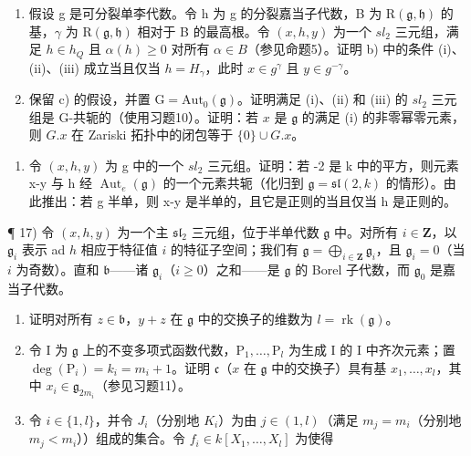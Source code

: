 \begin{enumerate}
\def\labelenumi{\alph{enumi})}
\setcounter{enumi}{2}
\item
  假设 g 是可分裂单李代数。令 h 为 g 的分裂嘉当子代数，B 为 \(\mathrm{R}(\mathfrak{g},\mathfrak{h})\) 的基，\(\gamma\) 为 \(\mathrm{R}(\mathfrak{g},\mathfrak{h})\) 相对于 B 的最高根。令 \((x,h,y)\) 为一个 \(sl_{2}\) 三元组，满足 \(h\in h_{Q}\) 且 \(\alpha(h)\geq0\) 对所有 \(\alpha\in B\)（参见命题5）。证明 b) 中的条件 (i)、(ii)、(iii) 成立当且仅当 \(h=H_{\gamma}\)，此时 \(x\in g^{\gamma}\) 且 \(y\in g^{-\gamma}\)。
\item
  保留 c) 的假设，并置 \(\mathrm{G} = \mathrm{Aut}_{0}(\mathfrak{g})\)。证明满足 (i)、(ii) 和 (iii) 的 \(sl_{2}\) 三元组是 G-共轭的（使用习题10）。证明：若 \(x\) 是 \(\mathfrak{g}\) 的满足 (i) 的非零幂零元素，则 \(G.x\) 在 Zariski 拓扑中的闭包等于 \(\{0\} \cup G.x\)。
\end{enumerate}

\begin{enumerate}
\def\labelenumi{\arabic{enumi})}
\setcounter{enumi}{15}
\tightlist
\item
  令 \((x,h,y)\) 为 g 中的一个 \(sl_{2}\) 三元组。证明：若 -2 是 k 中的平方，则元素 x-y 与 h 经 \(\operatorname{Aut}_{e}(\mathfrak{g})\) 的一个元素共轭（化归到 \(\mathfrak{g}=\mathfrak{sl}(2,k)\) 的情形）。由此推出：若 g 半单，则 x-y 是半单的，且它是正则的当且仅当 h 是正则的。
\end{enumerate}

¶ 17) 令 \((x, h, y)\) 为一个主 \(\mathfrak{sl}_2\) 三元组，位于半单代数 \(\mathfrak{g}\) 中。对所有 \(i \in \mathbf{Z}\)，以 \(\mathfrak{g}_i\) 表示 ad \(h\) 相应于特征值 \(i\) 的特征子空间；我们有 \(\mathfrak{g} = \bigoplus_{i \in \mathbf{Z}} \mathfrak{g}_i\)，且 \(\mathfrak{g}_i = 0\)（当 \(i\) 为奇数）。直和 \(\mathfrak{b}\)——诸 \(\mathfrak{g}_i\)（\(i \geq 0\)）之和——是 \(\mathfrak{g}\) 的 Borel 子代数，而 \(\mathfrak{g}_0\) 是嘉当子代数。

\begin{enumerate}
\def\labelenumi{\alph{enumi})}
\item
  证明对所有 \(z \in \mathfrak{b}\)，\(y + z\) 在 \(\mathfrak{g}\) 中的交换子的维数为 \(l = \operatorname{rk}(\mathfrak{g})\)。
\item
  令 I 为 \(\mathfrak{g}\) 上的不变多项式函数代数，\(\mathrm{P}_1, \ldots, \mathrm{P}_l\) 为生成 I 的 I 中齐次元素；置 \(\deg(\mathrm{P}_i) = k_i = m_i + 1\)。证明 \(\mathfrak{c}\)（\(x\) 在 \(\mathfrak{g}\) 中的交换子）具有基 \(x_1, \ldots, x_l\)，其中 \(x_i \in \mathfrak{g}_{2m_i}\)（参见习题11）。
\item
  令 \(i \in \{1, l\}\)，并令 \(J_i\)（分别地 \(K_i\)）为由 \(j \in (1, l)\)（满足 \(m_j = m_i\)（分别地 \(m_j < m_i\)））组成的集合。令 \(f_i \in k[X_1, \ldots, X_l]\) 为使得
\end{enumerate}

